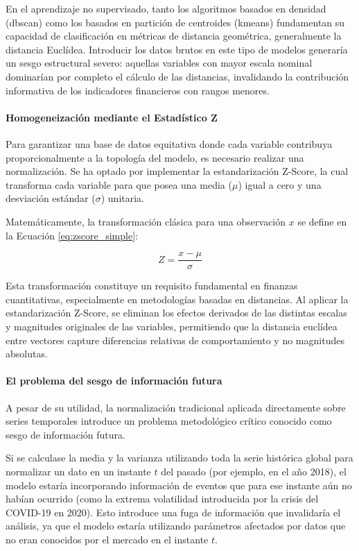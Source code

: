 \documentclass[
]{article}
\begin{document}
En el aprendizaje no supervisado, tanto los algoritmos basados en densidad (\gls{dbscan}) como los basados en partición de centroides (\gls{kmeans}) fundamentan su capacidad de clasificación en métricas de distancia geométrica, generalmente la distancia Euclídea. Introducir los datos brutos en este tipo de modelos generaría un sesgo estructural severo: aquellas variables con mayor escala nominal dominarían por completo el cálculo de las distancias, invalidando la contribución informativa de los indicadores financieros con rangos menores.

\paragraph{Homogeneización mediante el Estadístico Z}

Para garantizar una base de datos equitativa donde cada variable contribuya proporcionalmente a la topología del modelo, es necesario realizar una normalización. Se ha optado por implementar la estandarización Z-Score, la cual transforma cada variable para que posea una media ($\mu$) igual a cero y una desviación estándar ($\sigma$) unitaria.

Matemáticamente, la transformación clásica para una observación $x$ se define en la Ecuación \ref{eq:zscore_simple}:

\begin{equation}
    Z = \frac{x - \mu}{\sigma}
    \label{eq:zscore_simple}
\end{equation}

Esta transformación constituye un requisito fundamental en finanzas cuantitativas, especialmente en metodologías basadas en distancias. Al aplicar la estandarización Z-Score, se eliminan los efectos derivados de las distintas escalas y magnitudes originales de las variables, permitiendo que la distancia euclídea entre vectores capture diferencias relativas de comportamiento y no magnitudes absolutas.

\paragraph{El problema del sesgo de información futura}

A pesar de su utilidad, la normalización tradicional aplicada directamente sobre series temporales introduce un problema metodológico crítico conocido como sesgo de información futura. 

Si se calculase la media y la varianza utilizando toda la serie histórica global para normalizar un dato en un instante $t$ del pasado (por ejemplo, en el año 2018), el modelo estaría incorporando información de eventos que para ese instante aún no habían ocurrido (como la extrema volatilidad introducida por la crisis del COVID-19 en 2020). Esto introduce una fuga de información que invalidaría el análisis, ya que el modelo estaría utilizando parámetros afectados por datos que no eran conocidos por el mercado en el instante $t$.
\end{document}
